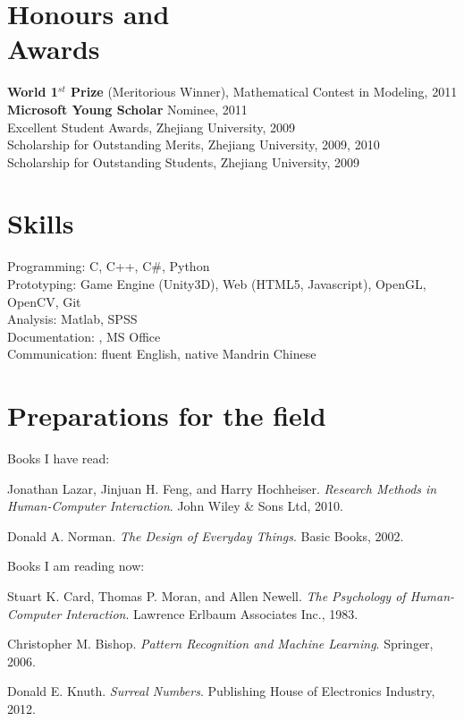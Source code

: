 \documentclass[margin,line]{resume}
\begin{document}
\begin{resume}
    \section{\mysidestyle Honours and\\Awards} 

   \textbf{World 1$^{st}$ Prize} (Meritorious Winner), Mathematical Contest in Modeling, 2011 \\
   \textbf{Microsoft Young Scholar} Nominee, 2011\\
   Excellent Student Awards, Zhejiang University, 2009\\
   Scholarship for Outstanding Merits, Zhejiang University, 2009, 2010\\
   Scholarship for Outstanding Students, Zhejiang University, 2009

    \section{\mysidestyle Skills} 
    
    Programming: C, C++, C\#, Python \\
    Prototyping: Game Engine (Unity3D), Web (HTML5, Javascript), OpenGL, OpenCV, Git\\
    Analysis: Matlab, SPSS \\
    Documentation: \LaTeXe, MS Office \\
    Communication: fluent English, native Mandrin Chinese



    \section{\mysidestyle Preparations for the field} 
    
    Books I have read: 
    \begin{list2}
        \item Jonathan Lazar, Jinjuan H. Feng, and Harry Hochheiser. \textsl{Research Methods in Human-Computer Interaction}. John Wiley \& Sons Ltd, 2010.
	\item Donald A. Norman. \textsl{The Design of Everyday Things}. Basic Books, 2002.     
    \end{list2}
    \vspace{-3mm}
    Books I am reading now:
    \begin{list2}
   	\item Stuart K. Card, Thomas P. Moran, and Allen Newell. \textsl{The Psychology of Human-Computer Interaction}. Lawrence Erlbaum Associates Inc., 1983.
	 \item Christopher M. Bishop. \emph{Pattern Recognition and Machine Learning}. Springer, 2006.
	 \item Donald E. Knuth. \emph{Surreal Numbers}. Publishing House of Electronics Industry, 2012.
    \end{list2}
        

\end{resume}
\end{document}
